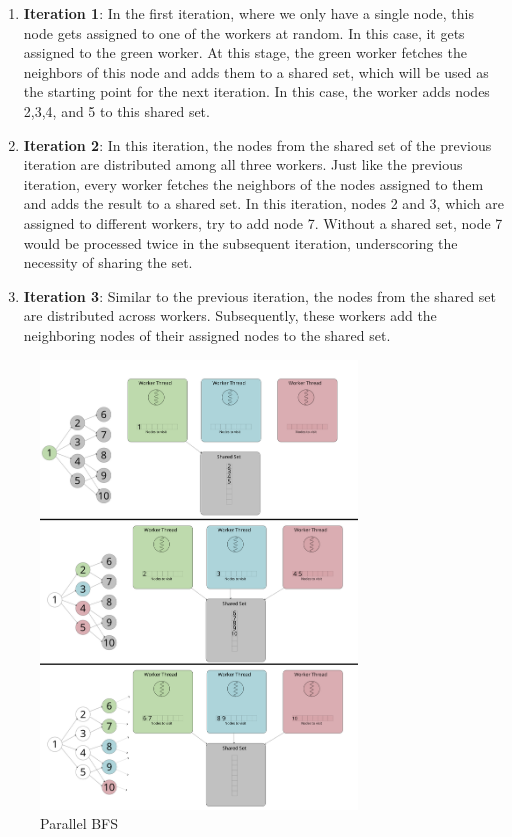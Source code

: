 \begin{enumerate}
    \item \textbf{Iteration 1}: In the first iteration, where we only have a
        single node, this node gets assigned to one of the workers at
        random. In this case, it gets assigned to the green worker. At this
        stage, the green worker fetches the neighbors of this node and adds
        them to a shared set, which will be used as the starting point for the
        next iteration. In this case, the worker adds nodes 2,3,4, and 5 to this
        shared set.
    \item \textbf{Iteration 2}: In this iteration, the nodes from the shared set
        of the previous iteration are distributed among all three workers. Just
        like the previous iteration, every worker fetches the neighbors of the
        nodes assigned to them and adds the result to a shared set. In this
        iteration, nodes 2 and 3, which are assigned to different workers, try
        to add node 7. Without a shared set, node 7 would be processed twice in 
        the subsequent iteration, underscoring the necessity of sharing the set.
    \item \textbf{Iteration 3}: Similar to the previous iteration, the nodes from
        the shared set are distributed across workers. Subsequently, these
        workers add the neighboring nodes of their assigned nodes to the shared
        set.
\end{enumerate}
\begin{figure}[ht]
    \centering
    \includegraphics[width=0.75\textwidth]{figures/parallelBFS.png}
    \caption{Parallel BFS}
    \label{fig:parallelBFS}
\end{figure}

